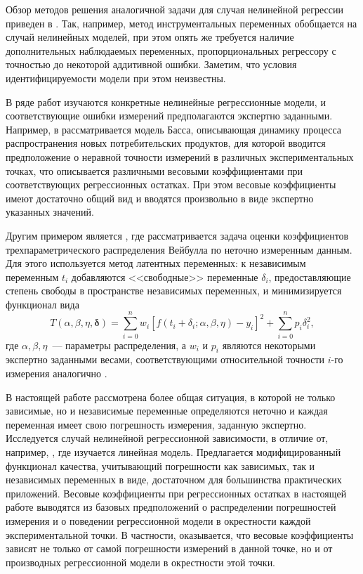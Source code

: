 \documentclass[tikz,10pt,a4paper]{article}
\begin{document}
Обзор методов решения аналогичной задачи для случая нелинейной
регрессии приведен в \cite{Carrol06MeasurementErrors}.
Так, например, метод инструментальных переменных
обобщается на случай нелинейных моделей, при этом
опять же требуется наличие дополнительных наблюдаемых переменных,
пропорциональных регрессору с точностью до некоторой аддитивной
ошибки.
Заметим, что условия идентифицируемости модели при этом неизвестны.

В ряде работ изучаются конкретные нелинейные
регрессионные модели, и соответствующие ошибки измерений
предполагаются экспертно заданными.
Например, в \cite{jukic2013nonlinear} рассматривается модель Басса,
описывающая динамику процесса распространения новых потребительских продуктов,
для которой вводится предположение о неравной точности измерений в различных
экспериментальных точках, что описывается различными весовыми коэффициентами при
соответствующих регрессионных остатках. При этом весовые коэффициенты имеют достаточно
общий вид и вводятся произвольно в виде экспертно указанных значений.

Другим примером является \cite{jukic2010nonlinear}, где рассматривается задача оценки коэффициентов
трехпараметрического распределения Вейбулла по неточно измеренным данным.
Для этого используется метод латентных переменных: к
независимым переменным $t_i$ добавляются <<свободные>> переменные $\delta_i$,
предоставляющие степень свободы в пространстве независимых переменных, и минимизируется
функционал вида
\[
  T(\alpha, \beta, \eta, \boldsymbol{\delta}) = \sum_{i = 0}^n w_i [f(t_i + \delta_i; \alpha, \beta, \eta) - y_i]^2 + \sum_{i = 0}^n p_i \delta_i^2,
\]
где $\alpha, \beta, \eta$~--- параметры распределения, а $w_i$ и $p_i$ являются
некоторыми экспертно заданными весами, соответствующими относительной точности
$i$-го измерения аналогично \cite{jukic2013nonlinear}.

В настоящей работе рассмотрена более общая ситуация, в которой не только зависимые,
но и независимые переменные определяются неточно и каждая переменная
имеет свою погрешность измерения, заданную экспертно.
Исследуется случай
нелинейной регрессионной зависимости, в отличие от, например,
\cite{kiryati2000heteroscedastic}, где изучается линейная модель.
Предлагается модифицированный функционал качества, учитывающий погрешности как
зависимых, так и независимых переменных в виде, достаточном для большинства
практических приложений. Весовые коэффициенты при регрессионных остатках
в настоящей работе выводятся из базовых предположений о распределении
погрешностей измерения и о поведении регрессионной модели в окрестности каждой
экспериментальной точки. В частности, оказывается, что весовые коэффициенты
зависят не только от самой погрешности измерений в данной точке, но и от
производных регрессионной модели в окрестности этой точки.
\end{document}

